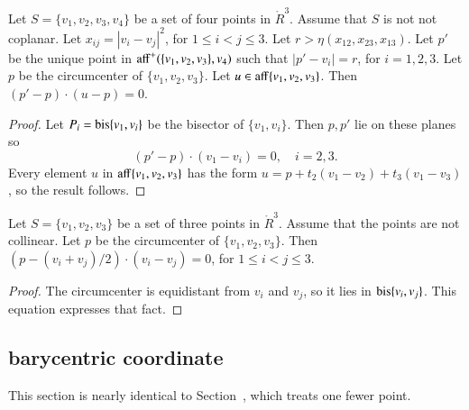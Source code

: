\begin{tarskidata}
\begin{tarski}
\begin{lemma}
Let $S=\{v_1,v_2,v_3,v_4\}$ be a set of four points
in $\ring{R}^3$.  Assume that $S$ is not not coplanar.
Let $x_{ij} = |v_i-v_j|^2$, for $1\le i < j\le 3$.
Let $r > \eta(x_{12},x_{23},x_{13})$.
Let $p'$ be the unique point in
${\operatorname{aff}}^+(\{v_1,v_2,v_3\},v_4)$
such that
   $|p'-v_i| = r$, for $i=1,2,3$.
Let $p$ be the circumcenter of $\{v_1,v_2,v_3\}$.  Let 
$u\in {\operatorname{aff}}\{v_1,v_2,v_3\}$.  Then
  $(p'-p)\cdot (u-p)=0$.
\end{lemma}

\begin{proof}  Let $P_i={\operatorname{bis}}\{v_1,v_i\}$ 
be the bisector
of $\{v_1,v_i\}$.  Then $p,p'$ lie on these planes so
  $$(p'-p)\cdot (v_1-v_i)=0,\quad i=2,3.$$
Every element $u$ in ${\operatorname{aff}}\{v_1,v_2,v_3\}$
has the form $u=p + t_2(v_1-v_2) + t_3(v_1-v_3)$, so the result
follows.
\end{proof}
\end{tarski}





\begin{tarski}

\begin{lemma}
Let $S=\{v_1,v_2,v_3\}$ be a set of three points
in $\ring{R}^3$.  Assume that the points are not collinear.
Let $p$ be the circumcenter of $\{v_1,v_2,v_3\}$.   Then
  $(p-(v_i+v_j)/2)\cdot (v_i-v_j)=0$, for $1\le i<j\le 3$.
\end{lemma}

\begin{proof}  The circumcenter is equidistant from $v_i$
and $v_j$, so it lies in ${\operatorname{bis}}\{v_i,v_j\}$.
This equation expresses that fact.
\end{proof}
\end{tarski}





\begin{tarski}
\subsection{barycentric coordinate}
This section is nearly identical to Section~, which treats one fewer point.


\end{tarski}
\end{tarskidata}
